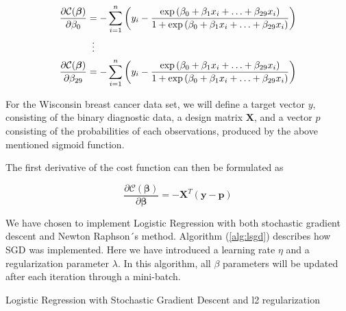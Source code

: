 \documentclass
[twocolumn,
secnumarabic,
nobibnotes,
aps,
prl,
reprint,
groupedaddress,
amsmath,
amssymb
]{revtex4-2}
\begin{document}
\begin{equation}
  \begin{aligned}
    \nonumber
    \frac{\partial \mathcal{C}(\boldsymbol{\beta})}{\partial \beta_0}    & = -\sum_{i=1}^n  \left(y_i -\frac{\exp{(\beta_0+\beta_1x_i+ \ldots +\beta_{29}x_i)}}{1+\exp{(\beta_0+\beta_1x_i+ \ldots +\beta_{29}x_i)}}\right) \\
                                                                         & \vdotswithin{=}                                                                                                                                  \\
    \frac{\partial \mathcal{C}(\boldsymbol{\beta})}{\partial \beta_{29}} & = -\sum_{i=1}^n  \left(y_i -\frac{\exp{(\beta_0+\beta_1x_i+ \ldots +\beta_{29}x_i)}}{1+\exp{(\beta_0+\beta_1x_i+ \ldots +\beta_{29}x_i)}}\right)
  \end{aligned}
\end{equation}

For the Wisconsin breast cancer data set, we will define a target vector $y$, consisting of the binary diagnostic data, a design matrix $\bm{X}$, and a vector $p$ consisting of the probabilities of each observations, produced by the above mentioned sigmoid function.

The first derivative of the cost function can then be formulated as

\begin{equation}
  \nonumber
  \frac{\partial \mathcal{C}(\boldsymbol{\beta})}{\partial \boldsymbol{\beta}} = -\boldsymbol{X}^T\left(\boldsymbol{y}-\boldsymbol{p}\right)
\end{equation}

We have chosen to implement Logistic Regression with both stochastic gradient descent and Newton Raphson´s method. Algorithm (\ref{alg:lsgd}) describes how SGD was implemented. Here we have introduced a learning rate $\eta$ and a regularization parameter $\lambda$. In this algorithm, all $\beta$ parameters will be updated after each iteration through a mini-batch.

\begin{algorithm}
  \Return{$\theta$}
  \caption{\label{alg:lsgd}Logistic Regression with Stochastic Gradient Descent and l2 regularization}
\end{algorithm}
\end{document}
